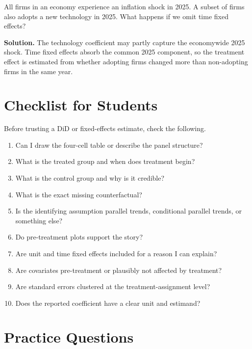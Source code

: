 \begin{exmp}
All firms in an economy experience an inflation shock in 2025. A subset of firms
also adopts a new technology in 2025. What happens if we omit time fixed effects?

\textbf{Solution.} The technology coefficient may partly capture the economywide
2025 shock. Time fixed effects absorb the common 2025 component, so the treatment
effect is estimated from whether adopting firms changed more than non-adopting
firms in the same year.
\end{exmp}

\section{Checklist for Students}

Before trusting a DiD or fixed-effects estimate, check the following.
\begin{enumerate}
    \item Can I draw the four-cell table or describe the panel structure?
    \item What is the treated group and when does treatment begin?
    \item What is the control group and why is it credible?
    \item What is the exact missing counterfactual?
    \item Is the identifying assumption parallel trends, conditional parallel
    trends, or something else?
    \item Do pre-treatment plots support the story?
    \item Are unit and time fixed effects included for a reason I can explain?
    \item Are covariates pre-treatment or plausibly not affected by treatment?
    \item Are standard errors clustered at the treatment-assignment level?
    \item Does the reported coefficient have a clear unit and estimand?
\end{enumerate}

\section{Practice Questions}

